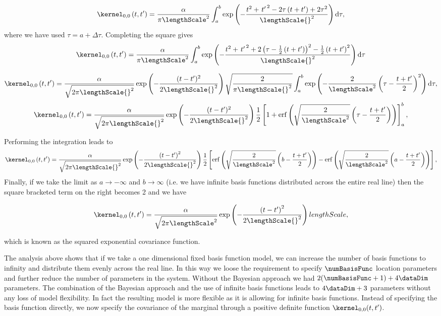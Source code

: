 \documentclass{article}
\begin{document}
\[
\kernel_{0,0}\left(t,t^\prime\right) = \frac{\alpha}{\pi \lengthScale^2}
\int_a^b \exp\left( -\frac{t^2 + \left.t^\prime\right.^2 - 2\tau
    \left(t+t^\prime\right) + 2\tau^2}{\lengthScale{}^2}
\right)\mathrm{d}\tau,
\]
where we have used $\tau = a+\Delta\tau$. Completing the square gives
\[
\kernel_{0,0}\left(t,t^\prime\right) = \frac{\alpha}{\pi \lengthScale^2}
\int_a^b \exp\left( -\frac{t^2 + \left.t^\prime\right.^2 + 2\left(\tau
      - \frac{1}{2}\left(t + t^\prime\right)\right)^2
    -\frac{1}{2}\left(t + t^\prime\right)^2}{\lengthScale{}^2}
\right)\mathrm{d}\tau
\]


\[
\kernel_{0,0}\left(t,t^\prime\right) =
\frac{\alpha}{\sqrt{2\pi\lengthScale{}^2}} \exp\left(
  -\frac{(t-t^\prime)^2}{2\lengthScale{}^2}\right) \sqrt{\frac{2}{\pi
    \lengthScale{}^2}}\int_a^b
\exp\left(-\frac{2}{\lengthScale^2}\left(\tau - \frac{t +
      t^\prime}{2}\right)^2 \right)\mathrm{d}\tau,
\]
\[
\kernel_{0,0}\left(t,t^\prime\right) =
\frac{\alpha}{\sqrt{2\pi\lengthScale{}^2}} \exp\left(
  -\frac{(t-t^\prime)^2}{2\lengthScale{}^2}\right)
\frac{1}{2}\left[1+\mathrm{erf}\left(\sqrt{\frac{2}{\lengthScale^2}}\left(\tau
      - \frac{t + t^\prime}{2}\right) \right)\right]_a^b,
\]

Performing the integration leads to 
\[
\kernel_{0,0}\left(t,t^\prime\right) =
\frac{\alpha}{\sqrt{2\pi\lengthScale{}^2}} \exp\left(
  -\frac{\left(t-t^\prime\right)^2}{2\lengthScale{}^2}\right)
\frac{1}{2}\left[\mathrm{erf}\left(\sqrt{\frac{2}{\lengthScale^2}}\left(b
      - \frac{t + t^\prime}{2}\right) \right) -
  \mathrm{erf}\left(\sqrt{\frac{2}{\lengthScale^2}}\left(a - \frac{t +
        t^\prime}{2}\right) \right)\right],
\]
Finally, if we take the limit as $a\rightarrow -\infty$ and
$b\rightarrow \infty$ (i.e. we have infinite basis functions
distributed across the entire real line) then the square bracketed
term on the right becomes 2 and we have

\begin{equation}
\kernel_{0,0}\left(t,t^\prime\right) =
\frac{\alpha}{\sqrt{2\pi\lengthScale^2}}\exp\left(
  -\frac{\left(t-t^\prime\right)^2}{2\lengthScale{}^2}\right) \\lengthScale ,
\label{eq:RBF}
\end{equation}

which is known as the squared exponential covariance function. 

The analysis above shows that if we take a one dimensional fixed
basis function model, we can increase the number of basis functions to
infinity and distribute them evenly across the real line. In this way
we loose the requirement to specify $\numBasisFunc$ location
parameters and further reduce the number of parameters in the
system. Without the Bayesian approach we had $2(\numBasisFunc +1) +
4\dataDim$ parameters. The combination of the Bayesian approach and
the use of infinite basis functions leads to $4\dataDim + 3$
parameters without any loss of model flexibility. In fact the resulting
model is more flexible as it is allowing for infinite basis
functions. Instead of specifying the basis function directly, we now
specify the covariance of the marginal through a positive definite
function $\kernel_{0,0}(t, t^\prime)$.
\end{document}
